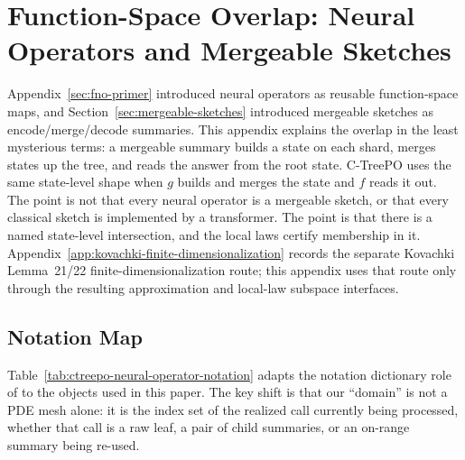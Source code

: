 \section{Function-Space Overlap: Neural Operators and Mergeable Sketches}\label{app:operator-overlap}

Appendix~\ref{sec:fno-primer} introduced neural operators as reusable
function-space maps, and Section~\ref{sec:mergeable-sketches} introduced
mergeable sketches as encode/merge/decode summaries. This appendix explains
the overlap in the least mysterious terms: a mergeable summary builds a state
on each shard, merges states up the tree, and reads the answer from the root
state. C-TreePO uses the same state-level shape when $g$ builds and merges the
state and $f$ reads it out. The point is not that every neural operator is a
mergeable sketch, or that every classical sketch is implemented by a
transformer. The point is that there is a named state-level intersection, and
the local laws certify membership in it.
Appendix~\ref{app:kovachki-finite-dimensionalization} records the
separate Kovachki Lemma~21/22 finite-dimensionalization route; this
appendix uses that route only through the resulting approximation and
local-law subspace interfaces.

\subsection{Notation Map}

Table~\ref{tab:ctreepo-neural-operator-notation} adapts the notation
dictionary role of \citet[Table~10]{Kovachki23NeuralOperator} to the
objects used in this paper. The key shift is that our ``domain'' is not a
PDE mesh alone: it is the index set of the realized call currently being
processed, whether that call is a raw leaf, a pair of child summaries, or
an on-range summary being re-used.

